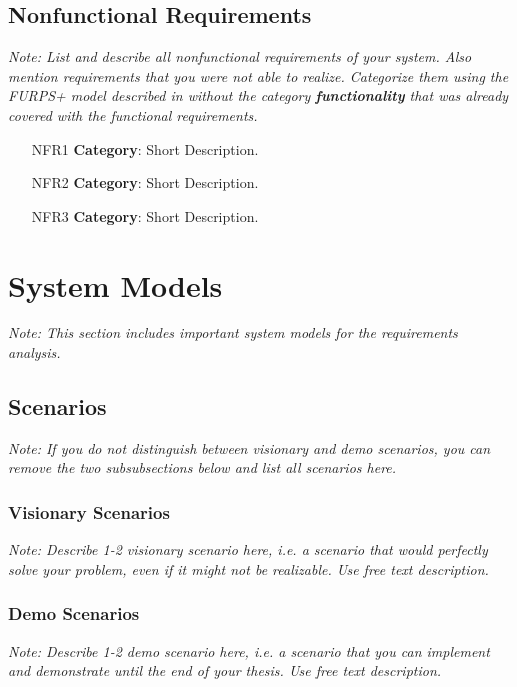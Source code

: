 \documentclass[a4paper,12pt,twoside]{report}
\begin{document}
\subsection{Nonfunctional Requirements}

\textit{Note: List and describe all nonfunctional requirements of your system. Also mention requirements that you were not able to realize. Categorize them using the FURPS+ model described in \cite{bruegge2004object} without the category \textbf{functionality} that was already covered with the functional requirements.}

\begin{itemize}
\item [NFR1] \textbf{Category}: Short Description.
\item [NFR2] \textbf{Category}: Short Description.
\item [NFR3] \textbf{Category}: Short Description.
\end{itemize}

\section{System Models}

\textit{Note: This section includes important system models for the requirements analysis.}

\subsection{Scenarios}

\textit{Note: If you do not distinguish between visionary and demo scenarios, you can remove the two subsubsections below and list all scenarios here.}

\subsubsection{Visionary Scenarios}

\textit{Note: Describe 1-2 visionary scenario here, i.e. a scenario that would perfectly solve your problem, even if it might not be realizable. Use free text description.}

\subsubsection{Demo Scenarios}

\textit{Note: Describe 1-2 demo scenario here, i.e. a scenario that you can implement and demonstrate until the end of your thesis. Use free text description.}
\end{document}
